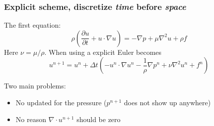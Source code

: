 \begin{frame}
\frametitle{Explicit scheme, discretize \emph{time} before \emph{space}}
The first equation: 
\[
    \rho (\frac{\partial u}{\partial t} + u \cdot \nabla u)
    =  -\nabla p  + \mu \nabla^2 u + \rho f 
\]
Here $\nu=\mu/\rho$. 
When using a explicit Euler becomes 
\[   
u^{n+1} = u^n + \Delta t ( -u^n \cdot \nabla u^n
    -\frac{1}{\rho}\nabla p^n  + \nu \nabla^2 u^n + f^n) 
\]


Two main problems: 
\begin{itemize}
\item No updated for the pressure ($p^{n+1}$ does not show up anywhere) 
\item No reason $\nabla \cdot u^{n+1}$ should be zero 
\end{itemize}
 
\end{frame}
